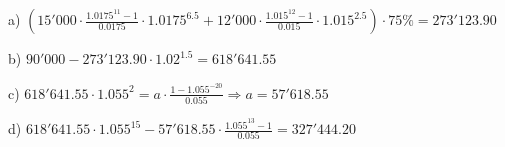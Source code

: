 \begin{solution}
a)	$\left( 15'000\cdot \frac{{{1.0175}^{11}}-1}{0.0175}\cdot {{1.0175}^{6.5}}+12'000\cdot \frac{{{1.015}^{12}}-1}{0.015}\cdot {{1.015}^{2.5}} \right)\cdot 75\%=273'123.90$

		b)	$90'000-273'123.90\cdot {{1.02}^{1.5}}=618'641.55$

		c)	$618'641.55\cdot {{1.055}^{2}}=a\cdot \frac{1-{{1.055}^{-20}}}{0.055}\Rightarrow a=57'618.55$

		d)	$618'641.55\cdot {{1.055}^{15}}-57'618.55\cdot \frac{{{1.055}^{13}}-1}{0.055}=327'444.20$
\end{solution}